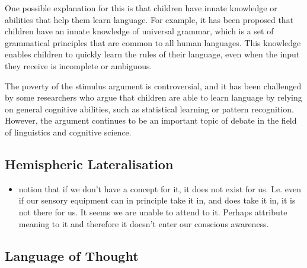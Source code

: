 One possible explanation for this is that children have innate knowledge or abilities that help them learn language. For example, it has been proposed that children have an innate knowledge of universal grammar, which is a set of grammatical principles that are common to all human languages. This knowledge enables children to quickly learn the rules of their language, even when the input they receive is incomplete or ambiguous.

The poverty of the stimulus argument is controversial, and it has been challenged by some researchers who argue that children are able to learn language by relying on general cognitive abilities, such as statistical learning or pattern recognition. However, the argument continues to be an important topic of debate in the field of linguistics and cognitive science.

\subsection{Hemispheric Lateralisation}
\begin{itemize}
    \item notion that if we don't have a concept for it, it does not exist for us. I.e. even if our sensory equipment can in principle take it in, and does take it in, it is not there for us. It seems we are unable to attend to it. Perhaps attribute meaning to it and therefore it doesn't enter our conscious awareness.
\end{itemize}

\subsection{Language of Thought}

